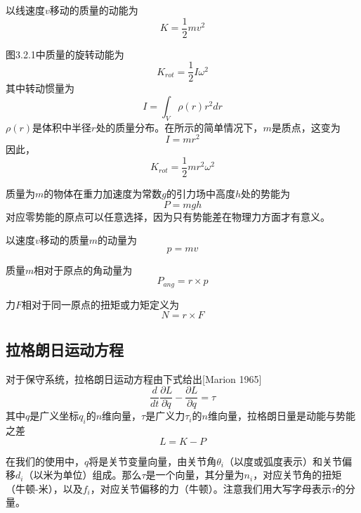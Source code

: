 \documentclass[12pt,a4paper]{ctexart}
\begin{document}
以线速度$v$移动的质量的动能为
\begin{equation}
K = \frac{1}{2}mv^2
\end{equation}

图3.2.1中质量的旋转动能为
\begin{equation}
K_{rot} = \frac{1}{2}I\omega^2
\end{equation}
其中转动惯量为
\begin{equation}
I = \int_V \rho(r)r^2 dr
\end{equation}
$\rho(r)$是体积中半径$r$处的质量分布。在所示的简单情况下，$m$是质点，这变为
\begin{equation}
I = mr^2
\end{equation}
因此，
\begin{equation}
K_{rot} = \frac{1}{2}mr^2\omega^2
\end{equation}

质量为$m$的物体在重力加速度为常数$g$的引力场中高度$h$处的势能为
\begin{equation}
P = mgh
\end{equation}
对应零势能的原点可以任意选择，因为只有势能差在物理力方面才有意义。

以速度$v$移动的质量$m$的动量为
\begin{equation}
p = mv
\end{equation}

质量$m$相对于原点的角动量为
\begin{equation}
P_{ang} = r \times p
\end{equation}

力$F$相对于同一原点的扭矩或力矩定义为
\begin{equation}
N = r \times F
\end{equation}

\subsection{拉格朗日运动方程}

对于保守系统，拉格朗日运动方程由下式给出[Marion 1965]
\begin{equation}
\frac{d}{dt}\frac{\partial L}{\partial \dot{q}} - \frac{\partial L}{\partial q} = \tau
\end{equation}
其中$q$是广义坐标$q_i$的$n$维向量，$\tau$是广义力$\tau_i$的$n$维向量，拉格朗日量是动能与势能之差
\begin{equation}
L = K - P
\end{equation}

在我们的使用中，$q$将是关节变量向量，由关节角$\theta_i$（以度或弧度表示）和关节偏移$d_i$（以米为单位）组成。那么$\tau$是一个向量，其分量为$n_i$，对应关节角的扭矩（牛顿-米），以及$f_i$，对应关节偏移的力（牛顿）。注意我们用大写字母表示$\tau$的分量。
\end{document}

